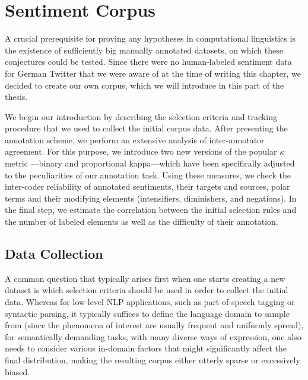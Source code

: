 

\chapter{Sentiment Corpus}\label{chap:corpus}

A crucial prerequisite for proving any hypotheses in computational
linguistics is the existence of sufficiently big manually annotated
datasets, on which these conjectures could be tested.  Since there
were no human-labeled sentiment data for German Twitter that we were
aware of at the time of writing this chapter, we decided to create our
own corpus, which we will introduce in this part of the thesis.

We begin our introduction by describing the selection criteria and
tracking procedure that we used to collect the initial corpus data.
After presenting the annotation scheme, we perform an extensive
analysis of inter-annotator agreement.  For this purpose, we introduce
two new versions of the popular $\kappa$ metric
\cite{Cohen:60}---binary and proportional kappa---which have been
specifically adjusted to the peculiarities of our annotation task.
Using these measures, we check the inter-coder reliability of
annotated sentiments, their targets and sources, polar terms and their
modifying elements (intensifiers, diminishers, and negations).  In the
final step, we estimate the correlation between the initial selection
rules and the number of labeled elements as well as the difficulty of
their annotation.

\section{Data Collection}

A common question that typically arises first when one starts creating
a new dataset is which selection criteria should be used in order to
collect the initial data.  Whereas for low-level NLP applications,
such as part-of-speech tagging or syntactic parsing, it typically
suffices to define the language domain to sample from (since the
phenomena of interest are usually frequent and uniformly spread), for
semantically demanding tasks, with many diverse ways of expression,
one also needs to consider various in-domain factors that might
significantly affect the final distribution, making the resulting
corpus either utterly sparse or excessively biased.

